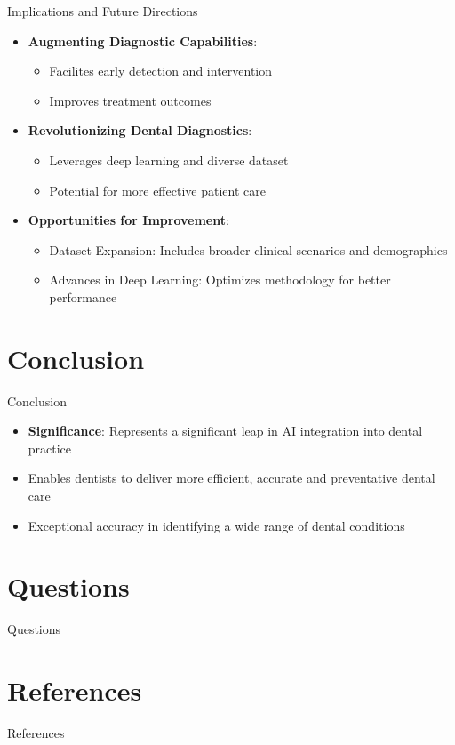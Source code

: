 \documentclass{beamer}
\begin{document}
\begin{frame}{Implications and Future Directions}
	\begin{itemize}
		\vfill
		\item \textbf{Augmenting Diagnostic Capabilities}:
		\begin{itemize}
			\item Facilites early detection and intervention
			\item Improves treatment outcomes
		\end{itemize} 
		\vfill
		\item \textbf{Revolutionizing Dental Diagnostics}: 
		\begin{itemize}
			\item Leverages deep learning and diverse dataset
			\item Potential for more effective patient care
		\end{itemize} 
		\vfill
		\item \textbf{Opportunities for Improvement}:
		\begin{itemize}
			\item Dataset Expansion: Includes broader clinical scenarios and demographics
			\item Advances in Deep Learning: Optimizes methodology for better performance
		\end{itemize} 
	\end{itemize}
\end{frame}

\section[Conclusion]{Conclusion}
\begin{frame}{Conclusion}
	\begin{itemize}
		\vfill
		\item \textbf{Significance}: Represents a significant leap in AI integration into dental practice
		\vfill
		\item Enables dentists to deliver more efficient, accurate and preventative dental care
		\vfill
		\item Exceptional accuracy in identifying a wide range of dental conditions
	\end{itemize}
\end{frame}

\section[Questions]{Questions}
\begin{frame}{Questions}
\end{frame}

\section{References}
\begin{frame}[allowframebreaks]{References}
	\nocite{*}
    
    
\end{frame}
\end{document}
